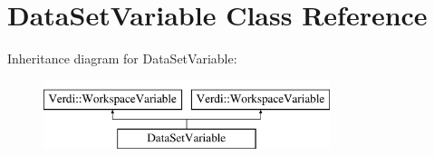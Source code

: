 \hypertarget{class_data_set_variable}{\section{\-Data\-Set\-Variable \-Class \-Reference}
\label{class_data_set_variable}
}
\-Inheritance diagram for \-Data\-Set\-Variable\-:\begin{figure}[H]
\begin{center}
\leavevmode
\includegraphics[height=2.000000cm]{class_data_set_variable}
\end{center}
\end{figure}
